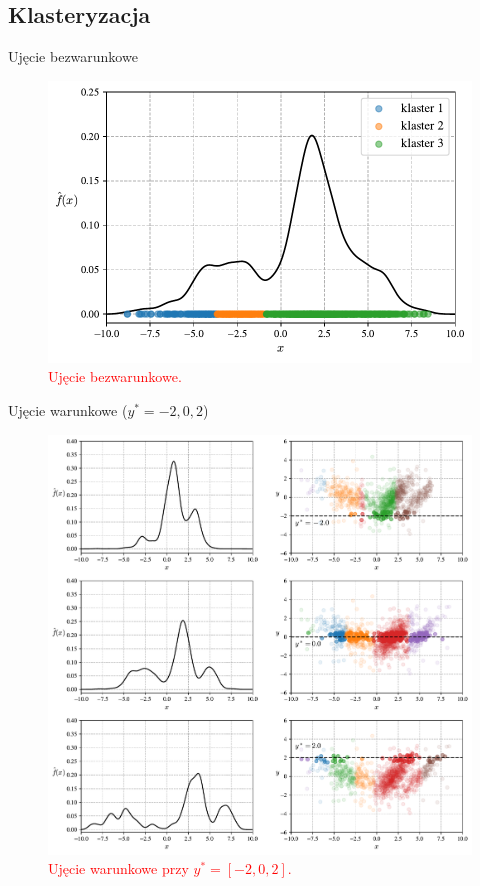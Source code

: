 \documentclass[12pt,a4paper,oneside]{book}
\theoremstyle{definition}
\begin{document}
\subsection*{Klasteryzacja}

Ujęcie bezwarunkowe
\begin{figure}[H]
    \centering
    \includegraphics[scale=0.7]{synthetic_data_clustering_kde}
    \vspace{-0.5cm} 
    \caption{\textcolor{red}{Ujęcie bezwarunkowe.}}
\end{figure}

\noindent Ujęcie warunkowe ($y^*=-2,0,2$)
\begin{figure}[H]
    \centering
    \includegraphics[scale=0.5]{synthetic_data_clustering_ckde}
    \vspace{-0.5cm} 
    \caption{\textcolor{red}{Ujęcie warunkowe przy $y^*=[-2,0,2]$.}}
\end{figure}
\end{document}
